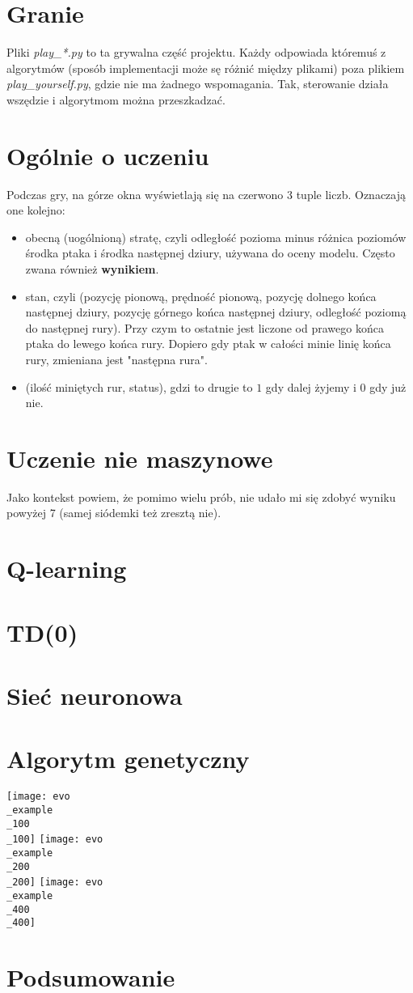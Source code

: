 \documentclass[12pt, A4]{article}
\begin{document}
\section{Granie}
Pliki \textit{play\_*.py} to ta grywalna część projektu. Każdy odpowiada któremuś z algorytmów (sposób implementacji może sę różnić między plikami) poza plikiem \textit{play\_yourself.py}, gdzie nie ma żadnego wspomagania. Tak, sterowanie działa wszędzie i algorytmom można przeszkadzać.


\section{Ogólnie o uczeniu}
Podczas gry, na górze okna wyświetlają się na czerwono 3 tuple liczb. Oznaczają one kolejno:
\begin{itemize}
	\item obecną (uogólnioną) stratę, czyli odległość pozioma minus różnica poziomów środka ptaka i środka następnej dziury, używana do oceny modelu. Często zwana również \textbf{wynikiem}.
	\item stan, czyli (pozycję pionową, prędność pionową, pozycję dolnego końca następnej dziury, pozycję górnego końca następnej dziury, odległość poziomą do następnej rury). Przy czym to ostatnie jest liczone od prawego końca ptaka do lewego końca rury. Dopiero gdy ptak w całości minie linię końca rury, zmieniana jest "następna rura".
	\item (ilość miniętych rur, status), gdzi to drugie to $1$ gdy dalej żyjemy i $0$ gdy już nie.
\end{itemize}


\section{Uczenie nie maszynowe}
Jako kontekst powiem, że pomimo wielu prób, nie udało mi się zdobyć wyniku powyżej 7 (samej siódemki też zresztą nie).


\section{Q-learning}


\section{TD(0)}


\section{Sieć neuronowa}


\section{Algorytm genetyczny}


\texttt{[image: evo\\\_example\\\_100\\\_100]}
\texttt{[image: evo\\\_example\\\_200\\\_200]}
\texttt{[image: evo\\\_example\\\_400\\\_400]}

\section{Podsumowanie}
\end{document}

